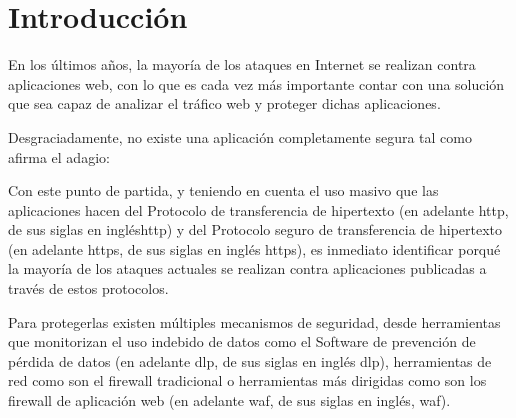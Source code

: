 \chapter{Introducción}
\par En los últimos años, la mayoría de los ataques en Internet se realizan contra aplicaciones web, con lo que es cada vez más importante
contar con una solución que sea capaz de analizar el tráfico web y proteger dichas aplicaciones.
\par Desgraciadamente, no existe una aplicación completamente segura tal como afirma el adagio:


\par Con este punto de partida, y teniendo en cuenta el uso masivo que las aplicaciones hacen del Protocolo de transferencia de hipertexto (en adelante \acrshort{http}, de sus siglas en inglés\acrlong{http}) y del
Protocolo seguro de transferencia de hipertexto (en adelante \acrshort{https}, de sus siglas en inglés \acrlong{https}), es inmediato identificar porqué la mayoría de los ataques actuales se realizan contra aplicaciones publicadas a través de
estos protocolos.

\par Para protegerlas existen múltiples mecanismos de seguridad, desde herramientas que monitorizan el uso indebido de datos como el Software de prevención de pérdida de datos (en
adelante \acrshort{dlp}, de sus siglas en inglés \acrlong{dlp}), herramientas de red como son el firewall tradicional o herramientas más dirigidas como son los firewall de
aplicación web (en adelante \acrshort{waf}, de sus siglas en inglés, \acrlong{waf}).

